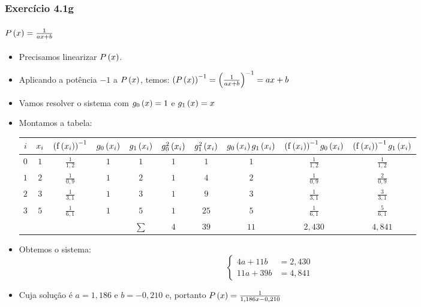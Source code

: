 \begin{frame}
\frametitle{Exercício 4.1g}
\framesubtitle{$P\left(x\right) = \frac{1}{ax + b}$}
\scriptsize

\begin{itemize}[<+->]
  \item Precisamos linearizar $P \left(x \right)$.
  \item Aplicando a potência $-1$ a $P \left(x \right)$, temos: $\left(P\left(x\right)\right)^{-1} = \left(\frac{1}{a x + b}\right)^{-1} = a x + b$
  \item Vamos resolver o sistema com $g_0\left(x\right) = 1$ e $g_1 \left(x\right) = x$
  \item Montamos a tabela:
\begin{tabular}{c|c|c|c|c|c|c|c|c|c}
$i$ & 
  $x_i$ & 
  $\left( \mathrm{f} \left(x_i\right) \right)^{-1}$ &
  $g_0 \left(x_i\right)$ &
  $g_1 \left(x_i\right)$ &
  $g_0^2 \left(x_i\right)$ &
  $g_1^2 \left(x_i\right)$ &
  $g_0 \left(x_i\right) g_1 \left(x_i\right)$ &
  $\left(\mathrm{f} \left(x_i\right) \right)^{-1} g_0 \left(x_i\right)$ &
  $\left(\mathrm{f} \left(x_i\right) \right)^{-1} g_1 \left(x_i\right)$\\
\hline
$0$ & $1$ & $\frac{1}{1,2}$ & $1$ & $1$ & $1$ & $1$  & $1$ & $\frac{1}{1,2}$ & $\frac{1}{1,2}$\\
\hline
$1$ & $2$ & $\frac{1}{0,9}$ & $1$ & $2$ & $1$ & $4$  & $2$ & $\frac{1}{0,9}$ & $\frac{2}{0,9}$\\
\hline
$2$ & $3$ & $\frac{1}{3,1}$ & $1$ & $3$ & $1$ & $9$  & $3$ & $\frac{1}{3,1}$ & $\frac{3}{3,1}$\\
\hline
$3$ & $5$ & $\frac{1}{6,1}$ & $1$ & $5$ & $1$ & $25$ & $5$ & $\frac{1}{6,1}$ & $\frac{5}{6,1}$\\
\hline
& & & & $\sum$ & $4$ & $39$ & $11$ & $2,430$ & $4,841$  
\end{tabular}
  \item Obtemos o sistema:
\[
\begin{cases}
4 a + 11 b &= 2,430\\
%
11 a + 39 b &= 4,841
\end{cases}
\]
  \item Cuja solução é $a = 1,186$ e $b = -0,210$ e, portanto $P\left(x\right) = \frac{1}{1,186 x -0,210}$
\end{itemize}

\end{frame}

